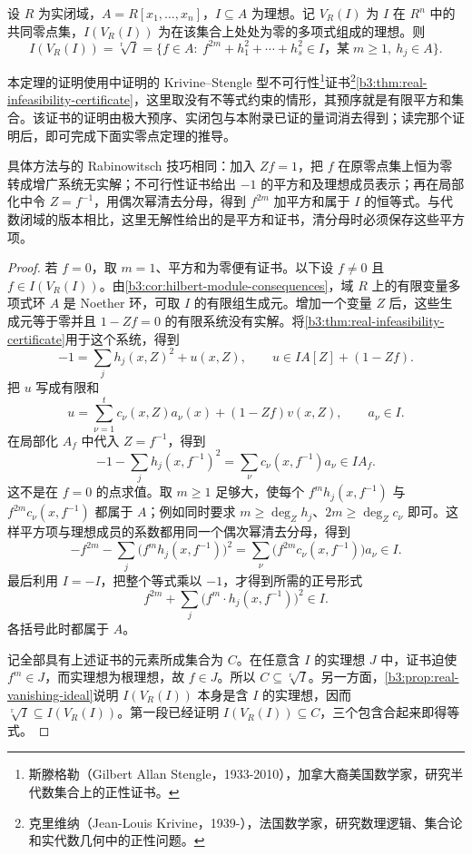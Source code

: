 \begin{theorem}[实零点定理]\label{b3:thm:real-nullstellensatz}
	设 \(R\) 为实闭域，\(A=R[x_1,\ldots,x_n]\)，\(I\subseteq A\) 为理想。记 \(V_R(I)\) 为 \(I\) 在 \(R^n\) 中的共同零点集，\(I(V_R(I))\) 为在该集合上处处为零的多项式组成的理想。则
	\[
		I(V_R(I))=\sqrt[\mathrm r]{I} =\{f\in A:\ f^{2m}+h_1^2+\cdots+h_s^2\in I \text{，某}\;m\ge1,\ h_j\in A\}.
	\]
\end{theorem}

本定理的证明使用中证明的 Krivine--Stengle 型不可行性\footnote{斯滕格勒（Gilbert Allan Stengle，1933-2010），加拿大裔美国数学家，研究半代数集合上的正性证书。}证书\footnote{克里维纳（Jean-Louis Krivine，1939-），法国数学家，研究数理逻辑、集合论和实代数几何中的正性问题。}\cref{b3:thm:real-infeasibility-certificate}，这里取没有不等式约束的情形，其预序就是有限平方和集合。该证书的证明由极大预序、实闭包与本附录已证的量词消去得到；读完那个证明后，即可完成下面实零点定理的推导。

\ProseParagraphBreak
具体方法与的 Rabinowitsch 技巧相同：加入 \(Zf=1\)，把 \(f\) 在原零点集上恒为零转成增广系统无实解；不可行性证书给出 \(-1\) 的平方和及理想成员表示；再在局部化中令 \(Z=f^{-1}\)，用偶次幂清去分母，得到 \(f^{2m}\) 加平方和属于 \(I\) 的恒等式。与代数闭域的版本相比，这里无解性给出的是平方和证书，清分母时必须保存这些平方项。

\begin{proof}
	若 \(f=0\)，取 \(m=1\)、平方和为零便有证书。以下设 \(f\ne0\) 且 \(f\in I(V_R(I))\)。由\cref{b3:cor:hilbert-module-consequences}，域 \(R\) 上的有限变量多项式环 \(A\) 是 Noether 环，可取 \(I\) 的有限组生成元。增加一个变量 \(Z\) 后，这些生成元等于零并且 \(1-Zf=0\) 的有限系统没有实解。将\cref{b3:thm:real-infeasibility-certificate}用于这个系统，得到
	\[
		-1=\sum_j h_j(x,Z)^2+u(x,Z), \qquad u\in I A[Z]+(1-Zf).
	\]
	把 \(u\) 写成有限和
	\[
		u=\sum_{\nu=1}^t c_\nu(x,Z)a_\nu(x)+(1-Zf)v(x,Z), \qquad a_\nu\in I.
	\]
	在局部化 \(A_f\) 中代入 \(Z=f^{-1}\)，得到
	\[
		-1-\sum_j h_j(x,f^{-1})^2 =\sum_\nu c_\nu(x,f^{-1})a_\nu\in IA_f.
	\]
	这不是在 \(f=0\) 的点求值。取 \(m\ge1\) 足够大，使每个 \(f^m h_j(x,f^{-1})\) 与 \(f^{2m}c_\nu(x,f^{-1})\) 都属于 \(A\)；例如同时要求 \(m\ge\deg_Zh_j\)、\(2m\ge\deg_Zc_\nu\) 即可。这样平方项与理想成员的系数都用同一个偶次幂清去分母，得到
	\[
		-f^{2m}-\sum_j\bigl(f^m h_j(x,f^{-1})\bigr)^2 =\sum_\nu\bigl(f^{2m}c_\nu(x,f^{-1})\bigr)a_\nu\in I.
	\]
	最后利用 \(I=-I\)，把整个等式乘以 \(-1\)，才得到所需的正号形式
	\[
		f^{2m}+\sum_j\bigl(f^m\cdot h_j(x,f^{-1})\bigr)^2\in I.
	\]
	各括号此时都属于 \(A\)。

	记全部具有上述证书的元素所成集合为 \(C\)。在任意含 \(I\) 的实理想 \(J\) 中，证书迫使 \(f^m\in J\)，而实理想为根理想，故 \(f\in J\)。所以 \(C\subseteq\sqrt[\mathrm r]{I}\)。另一方面，\cref{b3:prop:real-vanishing-ideal}说明 \(I(V_R(I))\) 本身是含 \(I\) 的实理想，因而 \(\sqrt[\mathrm r]{I}\subseteq I(V_R(I))\)。第一段已经证明 \(I(V_R(I))\subseteq C\)，三个包含合起来即得等式。
\end{proof}

